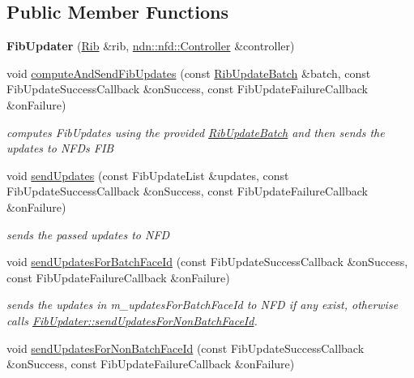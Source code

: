 \subsection*{Public Member Functions}
\begin{DoxyCompactItemize}
\item 
{\bfseries Fib\+Updater} (\hyperlink{classnfd_1_1rib_1_1Rib}{Rib} \&rib, \hyperlink{classndn_1_1nfd_1_1Controller}{ndn\+::nfd\+::\+Controller} \&controller)\hypertarget{classnfd_1_1rib_1_1FibUpdater_a94872d5edd5e021459c2dde505bba818}{}\label{classnfd_1_1rib_1_1FibUpdater_a94872d5edd5e021459c2dde505bba818}

\item 
void \hyperlink{classnfd_1_1rib_1_1FibUpdater_afdf597ef66822604f08f440df6b0732b}{compute\+And\+Send\+Fib\+Updates} (const \hyperlink{classnfd_1_1rib_1_1RibUpdateBatch}{Rib\+Update\+Batch} \&batch, const Fib\+Update\+Success\+Callback \&on\+Success, const Fib\+Update\+Failure\+Callback \&on\+Failure)
\begin{DoxyCompactList}\small\item\em computes Fib\+Updates using the provided \hyperlink{classnfd_1_1rib_1_1RibUpdateBatch}{Rib\+Update\+Batch} and then sends the updates to N\+FD\textquotesingle{}s F\+IB \end{DoxyCompactList}\item 
void \hyperlink{classnfd_1_1rib_1_1FibUpdater_a361fdb67b91245bdb2a4338f9be27715}{send\+Updates} (const Fib\+Update\+List \&updates, const Fib\+Update\+Success\+Callback \&on\+Success, const Fib\+Update\+Failure\+Callback \&on\+Failure)
\begin{DoxyCompactList}\small\item\em sends the passed updates to N\+FD \end{DoxyCompactList}\item 
void \hyperlink{classnfd_1_1rib_1_1FibUpdater_ac14122fdd905bb77fd56f0d8fb5b70f6}{send\+Updates\+For\+Batch\+Face\+Id} (const Fib\+Update\+Success\+Callback \&on\+Success, const Fib\+Update\+Failure\+Callback \&on\+Failure)\hypertarget{classnfd_1_1rib_1_1FibUpdater_ac14122fdd905bb77fd56f0d8fb5b70f6}{}\label{classnfd_1_1rib_1_1FibUpdater_ac14122fdd905bb77fd56f0d8fb5b70f6}

\begin{DoxyCompactList}\small\item\em sends the updates in m\+\_\+updates\+For\+Batch\+Face\+Id to N\+FD if any exist, otherwise calls \hyperlink{classnfd_1_1rib_1_1FibUpdater_a554c3a29611ca54110584a6e1aa37f74}{Fib\+Updater\+::send\+Updates\+For\+Non\+Batch\+Face\+Id}. \end{DoxyCompactList}\item 
void \hyperlink{classnfd_1_1rib_1_1FibUpdater_a554c3a29611ca54110584a6e1aa37f74}{send\+Updates\+For\+Non\+Batch\+Face\+Id} (const Fib\+Update\+Success\+Callback \&on\+Success, const Fib\+Update\+Failure\+Callback \&on\+Failure)\hypertarget{classnfd_1_1rib_1_1FibUpdater_a554c3a29611ca54110584a6e1aa37f74}{}\label{classnfd_1_1rib_1_1FibUpdater_a554c3a29611ca54110584a6e1aa37f74}


\end{DoxyCompactItemize}
